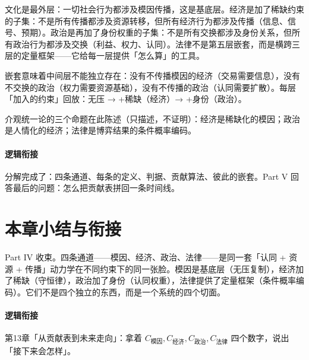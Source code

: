 \documentclass[../../main2.tex]{subfiles}
\begin{document}
	文化是最外层：一切社会行为都涉及模因传播，这是基底层。经济是加了稀缺约束的子集：不是所有传播都涉及资源转移，但所有经济行为都涉及传播（信息、信号、预期）。政治是再加了身份权重的子集：不是所有交换都涉及身份关系，但所有政治行为都涉及交换（利益、权力、认同）。法律不是第五层嵌套，而是横跨三层的定量框架——它给每一层提供「怎么算」的工具。

	嵌套意味着中间层不能独立存在：没有不传播模因的经济（交易需要信息），没有不交换的政治（权力需要资源基础），没有不传播的政治（认同需要扩散）。每层「加入的约束」回放：无压 → +稀缺（经济）→ +身份（政治）。

	介观统一论的三个命题在此陈述（只描述，不证明）：经济是稀缺化的模因；政治是人情化的经济；法律是博弈结果的条件概率编码。

	\paragraph*{逻辑衔接}
	分解完成了：四条通道、每条的定义、判据、贡献算法、彼此的嵌套。Part V 回答最后的问题：怎么把贡献表拼回一条时间线。
	\section{本章小结与衔接}
	\label{sec:law-summary}
	Part IV 收束。四条通道——模因、经济、政治、法律——是同一套「认同 + 资源 + 传播」动力学在不同约束下的同一张脸。模因是基底层（无压复制），经济加了稀缺（守恒律），政治加了身份（认同权重），法律提供了定量框架（条件概率编码）。它们不是四个独立的东西，而是一个系统的四个切面。

	\paragraph*{逻辑衔接}
	第13章「从贡献表到未来走向」：拿着 $C_{\text{模因}}, C_{\text{经济}}, C_{\text{政治}}, C_{\text{法律}}$ 四个数字，说出「接下来会怎样」。
\end{document}
